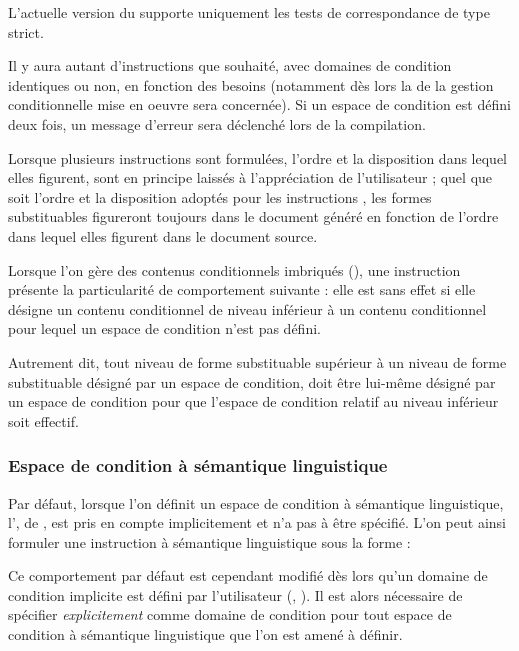 \documentclass{article}
\begin{document}
L'actuelle version du  supporte uniquement les tests de correspondance de type  strict.

Il y aura autant d'instructions  que souhaité, avec domaines de condition identiques ou non, en fonction des besoins (notamment dès lors la  de la gestion conditionnelle mise en oeuvre sera concernée). Si un espace de condition est défini deux fois, un message d'erreur sera déclenché lors de la compilation.

Lorsque plusieurs instructions  sont formulées, l'ordre et la disposition dans lequel elles figurent, sont en principe laissés à l'appréciation de l'utilisateur ; quel que soit l'ordre et la disposition adoptés pour les instructions , les formes substituables figureront toujours dans le document généré en fonction de l'ordre dans lequel elles figurent dans le document source.

Lorsque l'on gère des contenus conditionnels imbriqués (), une instruction  présente la particularité de comportement suivante : elle est sans effet si elle désigne un contenu conditionnel de niveau inférieur à un contenu conditionnel pour lequel un espace de condition n'est pas défini.

Autrement dit, tout niveau de forme substituable supérieur à un niveau de forme substituable désigné par un espace de condition, doit être lui-même désigné par un espace de condition pour que l'espace de condition relatif au niveau inférieur soit effectif.

\subsubsection{Espace de condition à sémantique linguistique}\label{CtDoc_Commandes_SetCondiSpace_Multilingue}
Par défaut, lorsque l'on définit un espace de condition à sémantique linguistique, l', de , est pris en compte implicitement et n'a pas à être spécifié. L'on peut ainsi formuler une instruction  à sémantique linguistique sous la forme :


Ce comportement par défaut est cependant modifié dès lors qu'un domaine de condition implicite est défini par l'utilisateur (, ). Il est alors nécessaire de spécifier \emph{explicitement}  comme domaine de condition pour tout espace de condition à sémantique linguistique que l'on est amené à définir.
\end{document}
